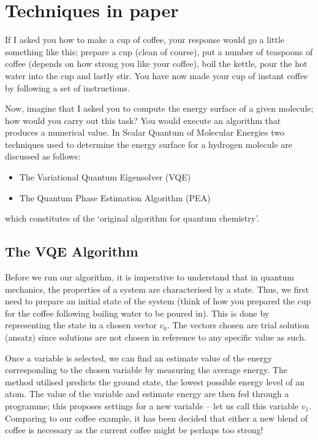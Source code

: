 \documentclass[12pt]{article}
\begin{document}
\section{Techniques in paper}
If I asked you how to make a cup of coffee, your response would go a little something like this; prepare a cup (clean of course), put a number of
 teaspoons of coffee (depends on how strong you like your coffee), boil the kettle, pour the hot water into the cup and lastly stir. You have now
 made your cup of instant coffee by following a set of instructions.

Now, imagine that I asked you to compute the energy surface of a given molecule; how would you carry out this task? You would execute an algorithm
 that produces a numerical value. In Scalar Quantum of Molecular Energies two techniques used to determine the energy surface for a hydrogen molecule
 are discussed as follows:
\begin{itemize}
\item The Variational Quantum Eigensolver (VQE)
\item The Quantum Phase Estimation Algorithm (PEA)
\end{itemize}
which constitutes of the ‘original algorithm for quantum chemistry’.

\subsection{The VQE Algorithm}

Before we run our algorithm, it is imperative to understand that in quantum mechanics, the properties of a system are characterised by a state.
Thus, we first need to prepare an initial state of the system (think of how you prepared the cup for the coffee following boiling water to be
poured in). This is done by representing the state in a chosen vector $v_0$. The vectors chosen are trial solution (ansatz) since solutions are
 not chosen in reference to any specific value as such.

Once a variable is selected, we can find an estimate value of the energy corresponding to the chosen variable by measuring the average energy.
The method utilised predicts the ground state, the lowest possible energy level of an atom. The value of the variable and estimate energy are
then fed through a programme; this proposes settings for a new variable – let us call this variable $v_1$­. Comparing to our coffee example, it
 has been decided that either a new blend of coffee is necessary as the current coffee might be perhaps too strong!
\end{document}
